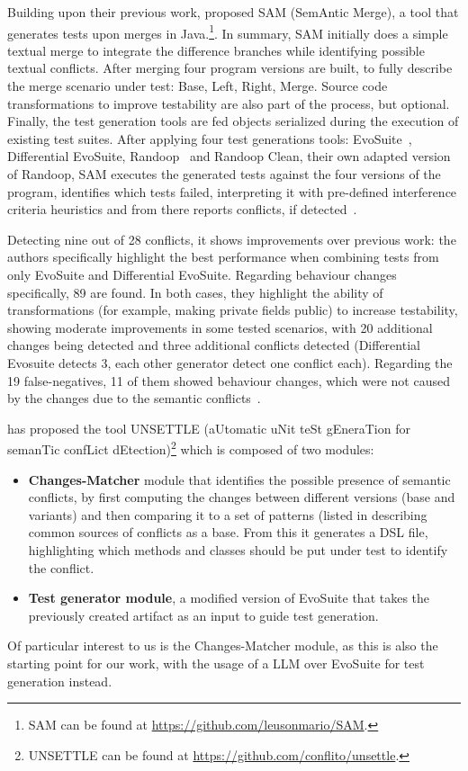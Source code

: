  Building upon their previous work, \citet{kn:leuson2} proposed SAM (SemAntic Merge), a tool that generates tests upon merges in Java.\footnote{SAM can be found at \url{https://github.com/leusonmario/SAM}.}. In summary, SAM initially does a simple textual merge to integrate the difference branches while identifying possible textual conflicts. After merging four program versions are built, to fully describe the merge scenario under test: Base, Left, Right, Merge. Source code transformations to improve testability are also part of the process, but optional. Finally, the test generation tools are fed objects serialized during the execution of existing test suites. After applying four test generations tools: EvoSuite~\cite{kn:evosuite}, Differential EvoSuite, Randoop~\cite{kn:randoop} and Randoop Clean, their own adapted version of Randoop, SAM executes the generated tests against the four versions of the program, identifies which tests failed, interpreting it with pre-defined interference criteria heuristics and from there reports conflicts, if detected~\cite{kn:leuson2}.

Detecting nine out of 28 conflicts, it shows improvements over previous work: the authors specifically highlight the best performance when combining tests from only EvoSuite and Differential EvoSuite. Regarding behaviour changes specifically, 89 are found. 
In both cases, they highlight the ability of transformations (for example, making private fields public) to increase testability, showing moderate improvements in some tested scenarios, with 20 additional changes being detected and three additional conflicts detected (Differential Evosuite detects 3, each other generator detect one conflict each).  Regarding the 19 false-negatives, 11 of them showed behaviour changes, which were not caused by the changes due to the semantic conflicts~\cite{kn:leuson2}.


\citet{kn:nuno} has proposed the tool UNSETTLE (aUtomatic uNit teSt gEneraTion for semanTic confLict dEtection)\footnote{UNSETTLE can be found at \url{https://github.com/conflito/unsettle}.} which is composed of two modules:
%
\begin{itemize}
  \item \textbf{Changes-Matcher} module that identifies the possible presence of semantic conflicts, by first computing the changes between different versions (base and variants) and then comparing it to a set of patterns (listed in   describing common sources of conflicts as a base. From this it generates a DSL file, highlighting which methods and classes should be put under test to identify the conflict.

  \item \textbf{Test generator module}, a modified version of EvoSuite that takes the previously created artifact as an input to guide test generation.
\end{itemize}
%
Of particular interest to us is the Changes-Matcher module, as this is also the starting point for our work, with the usage of a LLM over EvoSuite for test generation instead.

